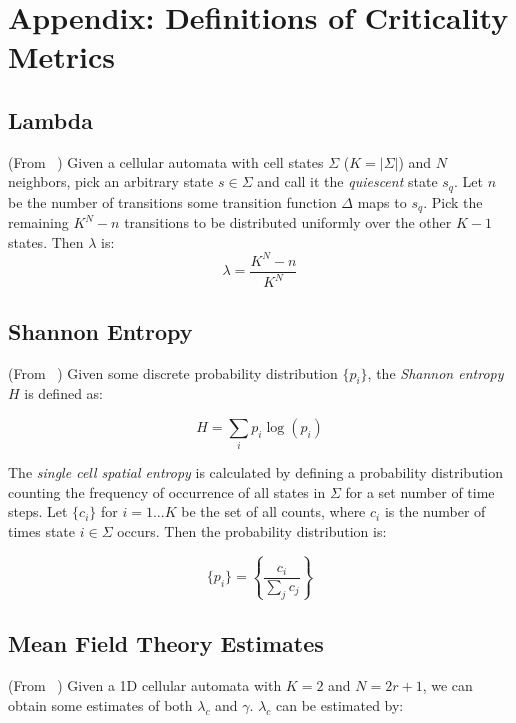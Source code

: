 \documentclass[a4paper,11pt]{article}
\begin{document}

\section{Appendix: Definitions of Criticality Metrics}
\label{app:Defs}

\subsection{Lambda}
\label{appA:lambda}
(From \citeauthor{la90}~\cite{la90}) Given a cellular automata with cell states $\Sigma$ ($K = |\Sigma|$) and $N$ neighbors, pick an arbitrary state $s \in \Sigma$ and call it the \textit{quiescent} state $s_q$. Let $n$ be the number of transitions some transition function $\Delta$ maps to $s_q$. Pick the remaining $K^N - n$ transitions to be distributed uniformly over the other $K-1$ states. Then $\lambda$ is:
\begin{equation}
\lambda = \frac{K^N - n}{K^N}
\end{equation}

\subsection{Shannon Entropy}
\label{appA:entrop}
(From \citeauthor{li90b}~\cite{li90b}) Given some discrete probability distribution $\{p_i\}$, the \textit{Shannon entropy} $H$ is defined as:

\begin{equation}
H = \sum_i p_i \log(p_i)
\end{equation}

The \textit{single cell spatial entropy} is calculated by defining a probability distribution counting the frequency of occurrence of all states in $\Sigma$ for a set number of time steps. Let $\{c_i\}$ for $i = 1...K$ be the set of all counts, where $c_i$ is the number of times state $i \in \Sigma$ occurs. Then the probability distribution is:

\begin{equation}
\{p_i\} = \left\{\frac{c_i}{\sum_j c_j}\right\}
\end{equation}

\subsection{Mean Field Theory Estimates}
\label{appA:MFT}
(From \citeauthor{li90b}~\cite{li90b}) Given a 1D cellular automata with $K=2$ and $N = 2r+1$, we can obtain some estimates of both $\lambda_c$ and $\gamma$. $\lambda_c$ can be estimated by:
\end{document}
